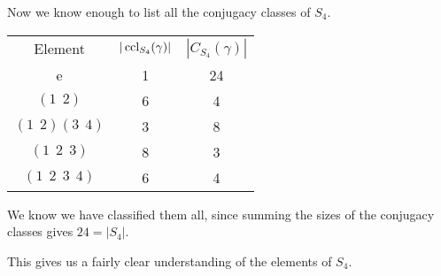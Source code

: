 \documentclass[../Main.tex]{subfiles}
\begin{document}
\begin{example}
    Now we know enough to list all the conjugacy classes of $S_4$.\par
    \begin{tabular}{c|c|c}
        Element & $|\operatorname{ccl}_{S_4}(\gamma)|$ & $|C_{S_4}(\gamma)|$ \\
        e & 1 & 24 \\
        \hline
        $(1~~2)$ & 6 & 4 \\
        $(1~~2)(3~~4)$ & 3 & 8 \\
        $(1~~2~~3)$ & 8 & 3 \\
        $(1~~2~~3~~4)$ & 6 & 4 
    \end{tabular}\par
    We know we have classified them all, since summing the sizes of the conjugacy classes gives $24 = |S_4|$.\par
    This gives us a fairly clear understanding of the elements of $S_4$.
\end{example}
\end{document}
